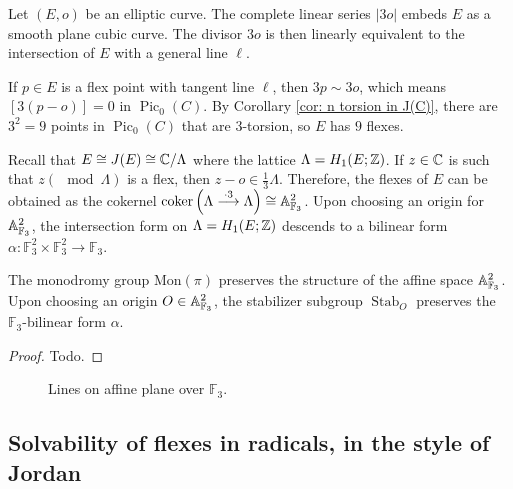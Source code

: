 \documentclass[11pt]{amsart}
\providecommand{\Mon}{\mathrm{Mon}}
\begin{document}
Let $(E,o)$ be an elliptic curve. The complete linear series $|3o|$ embeds $E$ as a smooth plane cubic curve. The divisor $3o$ is then linearly equivalent to the intersection of $E$ with a general line $\ell$. 

If $p\in E$ is a flex point with tangent line $\ell$, then $3p\sim 3o$, which means $[3(p-o)]= 0$ in $\operatorname{Pic}_0(C)$. By Corollary \ref{cor: n torsion in J(C)}, there are $3^2 = 9$ points in $\operatorname{Pic}_0(C)$ that are $3$-torsion, so $E$ has $9$ flexes. 

Recall that $E\cong J(E) \cong \mathbb{C}/ \Lambda$ where the lattice $\Lambda = H_1(E; \mathbb{Z})$. If $z\in \mathbb{C}$ is such that $z (\mod \Lambda)$ is a flex, then $z-o \in \frac{1}{3}\Lambda$. Therefore, the flexes of $E$ can be obtained as the cokernel $\operatorname{coker}\left(\Lambda \overset{\cdot 3}{\longrightarrow} \Lambda\right) \cong \mathbb{A}^2_{\mathbb{F}_3}$.
Upon choosing an origin for $\mathbb{A}^2_{\mathbb{F}_3}$, the intersection form on $\Lambda = H_1(E; \mathbb{Z})$ descends to a bilinear form $\alpha: \mathbb{F}_3^2 \times \mathbb{F}_3^2 \to \mathbb{F}_3$. 

\begin{proposition}
    The monodromy group $\Mon(\pi)$ preserves the structure of the affine space $\mathbb{A}^2_{\mathbb{F}_3}$. Upon choosing an origin $O \in \mathbb{A}^2_{\mathbb{F}_3}$, the stabilizer subgroup $\operatorname{Stab}_O$ preserves the $\mathbb{F}_3$-bilinear form $\alpha$. 
\end{proposition}

\begin{proof}
    Todo.
\end{proof}

\begin{figure}
    
    \caption{Lines on affine plane over $\mathbb{F}_3$.}
    \label{fig: A2 F3}
\end{figure}


\subsection{Solvability of flexes in radicals, in the style of Jordan}
\end{document}
